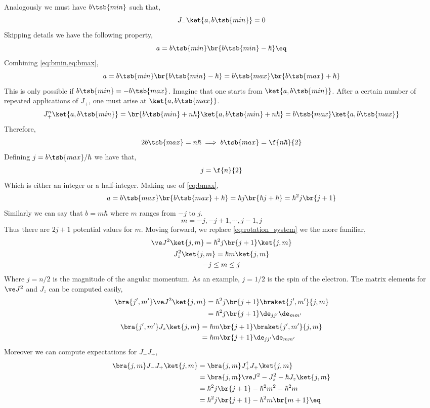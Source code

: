\documentclass{article}
\begin{document}
Analogously we must have $b\tsb{min}$ such that,
\[ J_- \ket{a, b\tsb{min}} = 0 \]
Skipping details we have the following property,
\[ a = b\tsb{min}\br{b\tsb{min} - \hbar} \eq \label{eq:bmin}\]
Combining \cref{eq:bmin,eq:bmax},
\[ a = b\tsb{min}\br{b\tsb{min} - \hbar} = b\tsb{max}\br{b\tsb{max} + \hbar} \]
This is only possible if $b\tsb{min} = -b\tsb{max}$. Imagine that one starts from $\ket{a, b\tsb{min}}$. After a certain number of repeated applications of $J_+$, one must arise at $\ket{a, b\tsb{max}}$.
\[ J_+^{n} \ket{a, b\tsb{min}} = \br{b\tsb{min} + n\hbar} \ket{a, b\tsb{min}+ n\hbar} = b\tsb{max}\ket{a, b\tsb{max}} \]
Therefore,
\[ 2 b\tsb{max} = n \hbar \implies b\tsb{max} = \f{n\hbar}{2} \]
Defining $j = b\tsb{max} / \hbar$ we have that,
\[ j = \f{n}{2} \]
Which is either an integer or a half-integer. Making use of \cref{eq:bmax},
\[ a = b\tsb{max}\br{b\tsb{max} + \hbar} = \hbar j \br{\hbar j + \hbar} = \hbar^2 j\br{j+1} \]
Similarly we can say that $b = m \hbar$ where $m$ ranges from $-j$ to $j$.
\[  m = -j, -j +1, \cdots, j-1, j \]
Thus there are $2j+1$ potential values for $m$. Moving forward, we replace \cref{eq:rotation_system} we the more familiar,
\begin{gather*}
    \ve J^2 \ket{j,m} = \hbar^2 j \br{j+1} \ket{j,m}\\
    J_z^2 \ket{j,m} = \hbar m \ket{j,m}\\
    -j \leq m \leq j
\end{gather*}
Where $j = n/2$ is the magnitude of the angular momentum. As an example, $j = 1/2$ is the spin of the electron. The matrix elements for $\ve J^2$ and $J_z$ can be computed easily,
\begin{align*}
    \bra{j', m'} \ve J^2 \ket{j,m}
    &= \hbar^2 j \br{j+1} \braket{j', m'}{j,m} \\
    &= \hbar^2 j \br{j+1} \de_{jj'}\de_{mm'}
\end{align*}
\begin{align*}
    \bra{j', m'} J_z \ket{j,m}
    &= \hbar m \br{j+1} \braket{j', m'}{j,m} \\
    &= \hbar m \br{j+1} \de_{jj'}\de_{mm'}
\end{align*}
Moreover we can compute expectations for $J_-J_+$,
\begin{align*}
    \bra{j,m}J_-J_+\ket{j,m}
    &= \bra{j,m}J_+^{\dagger}J_+\ket{j,m} \\
    &= \bra{j,m}\ve J^2 - J_z^2 - \hbar J_z\ket{j,m} \\
    &= \hbar^2 j \br{j+1} - \hbar^2 m^2 - \hbar^2 m \\
    &= \hbar^2 j \br{j+1} - \hbar^2 m\br{m+1} \eq \label{eq:jmpexp}
\end{align*}
\end{document}
